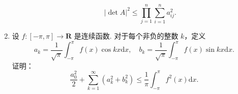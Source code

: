\begin{enumerate}
\begin{enumerate}
                        \[
                            \lvert \det A \rvert^2 \leqslant \prod_{j = 1}^n \sum_{i = 1}^n a_{ij}^2.
                        \]
            \end{enumerate}
    \item 设 $f: [-\pi, \pi] \to \mathbf{R}$ 是连续函数. 对于每个非负的整数 $k$，定义
            \[
                a_k = \dfrac{1}{\sqrt{\pi}} \int_{-\pi}^{\pi} f(x) \cos kx \mathrm{d}x, \quad b_k = \dfrac{1}{\sqrt{\pi}} \int_{-\pi}^{\pi} f(x) \sin kx \mathrm{d}x.
            \]
            证明：\[
                \dfrac{a_0^2}{2} + \sum_{k = 1}^{\infty} (a_k^2 + b_k^2) \leqslant \dfrac{1}{\pi} \int_{-\pi}^{\pi} f^2(x) \mathrm{d}x.
            \]
\end{enumerate}
